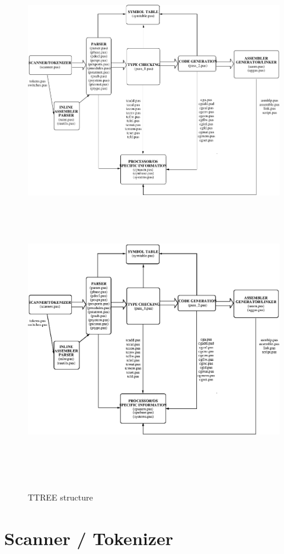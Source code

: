 \documentclass [a4paper,12pt]{article}
\begin{document}
\begin{figure}
\ifpdf
 \includegraphics{arch1.pdf}
\else
\includegraphics[width=6.45in,height=4.95in]{arch1.eps}
\fi
\caption{TTREE structure}
\label{fig1}
\end{figure}

\section{Scanner / Tokenizer}
\end{document}
